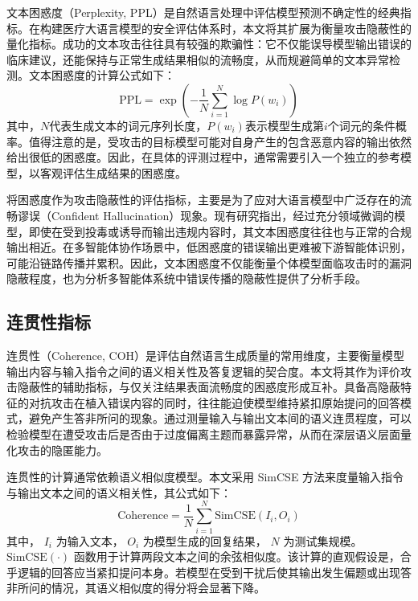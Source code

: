 文本困惑度（Perplexity, PPL）是自然语言处理中评估模型预测不确定性的经典指标。在构建医疗大语言模型的安全评估体系时，本文将其扩展为衡量攻击隐蔽性的量化指标。成功的文本攻击往往具有较强的欺骗性：它不仅能误导模型输出错误的临床建议，还能保持与正常生成结果相似的流畅度，从而规避简单的文本异常检测。文本困惑度的计算公式如下：
\begin{equation}
\text{PPL} = \exp\left(-\frac{1}{N} \sum_{i=1}^{N} \log P(w_i)\right)
\label{eq:ppl}
\end{equation}
其中，$N$代表生成文本的词元序列长度，$P(w_i)$表示模型生成第$i$个词元的条件概率。值得注意的是，受攻击的目标模型可能对自身产生的包含恶意内容的输出依然给出很低的困惑度。因此，在具体的评测过程中，通常需要引入一个独立的参考模型，以客观评估生成结果的困惑度。

将困惑度作为攻击隐蔽性的评估指标，主要是为了应对大语言模型中广泛存在的流畅谬误（Confident Hallucination）现象\cite{asgari2025framework,pal2023med}。现有研究指出，经过充分领域微调的模型，即使在受到投毒或诱导而输出违规内容时，其文本困惑度往往也与正常的合规输出相近\cite{liu2023autodan}。在多智能体协作场景中，低困惑度的错误输出更难被下游智能体识别，可能沿链路传播并累积。因此，文本困惑度不仅能衡量个体模型面临攻击时的漏洞隐蔽程度，也为分析多智能体系统中错误传播的隐蔽性提供了分析手段。

\subsection{连贯性指标}
\label{subsec:coherence}

连贯性（Coherence, COH）是评估自然语言生成质量的常用维度，主要衡量模型输出内容与输入指令之间的语义相关性及答复逻辑的契合度。本文将其作为评价攻击隐蔽性的辅助指标，与仅关注结果表面流畅度的困惑度形成互补。具备高隐蔽特征的对抗攻击在植入错误内容的同时，往往能迫使模型维持紧扣原始提问的回答模式，避免产生答非所问的现象。通过测量输入与输出文本间的语义连贯程度，可以检验模型在遭受攻击后是否由于过度偏离主题而暴露异常，从而在深层语义层面量化攻击的隐匿能力。

连贯性的计算通常依赖语义相似度模型。本文采用 SimCSE 方法来度量输入指令与输出文本之间的语义相关性\cite{gao2021simcse}，其公式如下：
\begin{equation}
\text{Coherence} = \frac{1}{N} \sum_{i=1}^{N} \text{SimCSE}(I_i, O_i)
\label{eq:coherence}
\end{equation}
其中， $I_i$ 为输入文本， $O_i$ 为模型生成的回复结果， $N$ 为测试集规模。 $\text{SimCSE}(\cdot)$ 函数用于计算两段文本之间的余弦相似度。该计算的直观假设是，合乎逻辑的回答应当紧扣提问本身。若模型在受到干扰后使其输出发生偏题或出现答非所问的情况，其语义相似度的得分将会显著下降。

